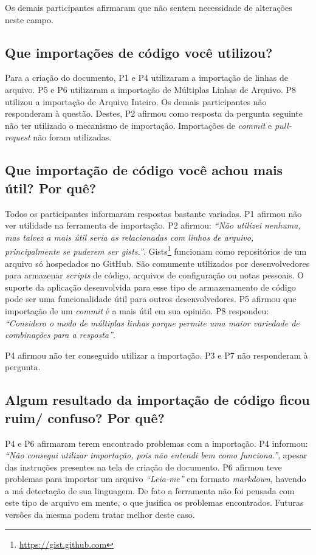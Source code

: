 Os demais participantes afirmaram que não sentem necessidade de alterações neste campo.

\subsection{Que importações de código você utilizou?}

Para a criação do documento, P1 e P4 utilizaram a importação de linhas de arquivo. P5 e P6 utilizaram a importação de Múltiplas Linhas de Arquivo. P8 utilizou a importação de Arquivo Inteiro. Os demais participantes não responderam à questão. Destes, P2 afirmou como resposta da pergunta seguinte não ter utilizado o mecanismo de importação. Importações de \textit{commit} e \textit{pull-request} não foram utilizadas.

\subsection{Que importação de código você achou mais útil? Por quê?}

Todos os participantes informaram respostas bastante variadas. P1 afirmou não ver utilidade na ferramenta de importação. P2 afirmou: \textit{``Não utilizei nenhuma, mas talvez a mais útil seria as relacionadas com linhas de arquivo, principalmente se puderem ser gists.''}. Gists\footnote{\url{https://gist.github.com}} funcionam como repositórios de um arquivo só hospedados no GitHub. São comumente utilizados por desenvolvedores para armazenar \textit{scripts} de código, arquivos de configuração ou notas pessoais. O suporte da aplicação desenvolvida para esse tipo de armazenamento de código pode ser uma funcionalidade útil para outros desenvolvedores. P5 afirmou que importação de um \textit{commit} é a mais útil em sua opinião. P8 respondeu: \textit{``Considero o modo de múltiplas linhas porque permite uma maior variedade de combinações para a resposta''}.

P4 afirmou não ter conseguido utilizar a importação. P3 e P7 não responderam à pergunta.

\subsection{Algum resultado da importação de código ficou ruim/ confuso? Por quê?}

P4 e P6 afirmaram terem encontrado problemas com a importação. P4 informou: \textit{``Não consegui utilizar importação, pois não entendi bem como funciona.''}, apesar das instruções presentes na tela de criação de documento. P6 afirmou teve problemas para importar um arquivo \textit{``Leia-me''} em formato \textit{markdown}, havendo a má detectação de sua linguagem. De fato a ferramenta não foi pensada com este tipo de arquivo em mente, o que jusifica os problemas encontrados. Futuras versões da mesma podem tratar melhor deste caso.

